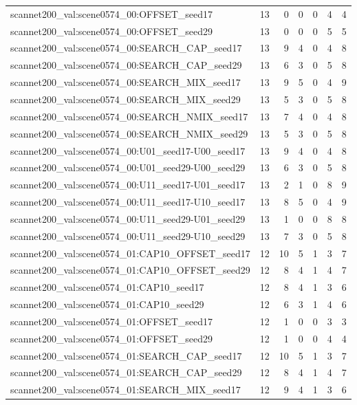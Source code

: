 \begin{table}[t]
\begin{tabular}{lrrrrrr}
scannet200\_val:scene0574\_00:OFFSET\_seed17 & 13 & 0 & 0 & 0 & 4 & 4 \\
scannet200\_val:scene0574\_00:OFFSET\_seed29 & 13 & 0 & 0 & 0 & 5 & 5 \\
scannet200\_val:scene0574\_00:SEARCH\_CAP\_seed17 & 13 & 9 & 4 & 0 & 4 & 8 \\
scannet200\_val:scene0574\_00:SEARCH\_CAP\_seed29 & 13 & 6 & 3 & 0 & 5 & 8 \\
scannet200\_val:scene0574\_00:SEARCH\_MIX\_seed17 & 13 & 9 & 5 & 0 & 4 & 9 \\
scannet200\_val:scene0574\_00:SEARCH\_MIX\_seed29 & 13 & 5 & 3 & 0 & 5 & 8 \\
scannet200\_val:scene0574\_00:SEARCH\_NMIX\_seed17 & 13 & 7 & 4 & 0 & 4 & 8 \\
scannet200\_val:scene0574\_00:SEARCH\_NMIX\_seed29 & 13 & 5 & 3 & 0 & 5 & 8 \\
scannet200\_val:scene0574\_00:U01\_seed17-U00\_seed17 & 13 & 9 & 4 & 0 & 4 & 8 \\
scannet200\_val:scene0574\_00:U01\_seed29-U00\_seed29 & 13 & 6 & 3 & 0 & 5 & 8 \\
scannet200\_val:scene0574\_00:U11\_seed17-U01\_seed17 & 13 & 2 & 1 & 0 & 8 & 9 \\
scannet200\_val:scene0574\_00:U11\_seed17-U10\_seed17 & 13 & 8 & 5 & 0 & 4 & 9 \\
scannet200\_val:scene0574\_00:U11\_seed29-U01\_seed29 & 13 & 1 & 0 & 0 & 8 & 8 \\
scannet200\_val:scene0574\_00:U11\_seed29-U10\_seed29 & 13 & 7 & 3 & 0 & 5 & 8 \\
scannet200\_val:scene0574\_01:CAP10\_OFFSET\_seed17 & 12 & 10 & 5 & 1 & 3 & 7 \\
scannet200\_val:scene0574\_01:CAP10\_OFFSET\_seed29 & 12 & 8 & 4 & 1 & 4 & 7 \\
scannet200\_val:scene0574\_01:CAP10\_seed17 & 12 & 8 & 4 & 1 & 3 & 6 \\
scannet200\_val:scene0574\_01:CAP10\_seed29 & 12 & 6 & 3 & 1 & 4 & 6 \\
scannet200\_val:scene0574\_01:OFFSET\_seed17 & 12 & 1 & 0 & 0 & 3 & 3 \\
scannet200\_val:scene0574\_01:OFFSET\_seed29 & 12 & 1 & 0 & 0 & 4 & 4 \\
scannet200\_val:scene0574\_01:SEARCH\_CAP\_seed17 & 12 & 10 & 5 & 1 & 3 & 7 \\
scannet200\_val:scene0574\_01:SEARCH\_CAP\_seed29 & 12 & 8 & 4 & 1 & 4 & 7 \\
scannet200\_val:scene0574\_01:SEARCH\_MIX\_seed17 & 12 & 9 & 4 & 1 & 3 & 6 \\

\end{tabular}
\end{table}
